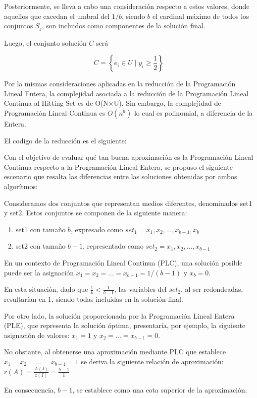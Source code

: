 Posteriormente, se lleva a cabo una consideración respecto a estos valores, donde aquellos que excedan el umbral del $1/b$, siendo $b$ el cardinal máximo de todos los conjuntos $S_j$, son incluidos como componentes de la solución final.

Luego, el conjunto solución $C$ será

\[
    C = \left\{e_i \in U \mid y_{i} \geq \frac{1}{2}\right\}
\]

Por la mismas consideraciones aplicadas en la reducción de la Programación Lineal Entera, la complejidad asociada a la reducción de la Programación Lineal Continua al Hitting Set es de O(N×U).
Sin embargo, la complejidad de Programación Lineal Continua es $O(n^9)$ lo cual es polinomial, a diferencia de la Entera. 

El codigo de la reducción es el siguiente:



Con el objetivo de evaluar qué tan buena aproximación es la Programación Lineal Continua respecto a la Programación Lineal Entera, se propuso el siguiente escenario que resalta las diferencias entre las soluciones obtenidas por ambos algorítmos:

Consideramos dos conjuntos que representan medios diferentes, denominados set1 y set2. Estos conjuntos se componen de la siguiente manera:
\begin{enumerate}
    \item set1 con tamaño $b$, expresado como $set_1={x_1, x_2, ..., x_{b-1},  x_b}$
    \item set2 con tamaño $b-1$, representado como $set_2={x_1, x_2, ..., x_{b-1}}$
\end{enumerate}

En un contexto de Programación Lineal Continua (PLC), una solución posible puede ser la asignación $x_1 = x_2 = ... = x_{b-1} = 1/(b-1)$ y $x_b=0$.

En esta situación, dado que $\frac{1}{b} < \frac{1}{b-1}$, las variables del $set_2$, al ser redondeadas, resultarían en 1, siendo todas incluidas en la solución final.

Por otro lado, la solución proporcionada por la Programación Lineal Entera (PLE), que representa la solución óptima, presentaría, por ejemplo, la siguiente asignación de valores:  $x_1 = 1$ y  $x_2 = ... = x_{b-1} = 0$. 

No obstante, al obtenerse una aproximación mediante PLC que establece $x_1 = x_2 = ... = x_{b-1} = 1$ se deriva la siguiente relación de aproximación: $r(A)=\frac{A(I)}{z(I)}=\frac{b-1}{1}$

En consecuencia, $b-1$, se establece como una cota superior de la aproximación. 

